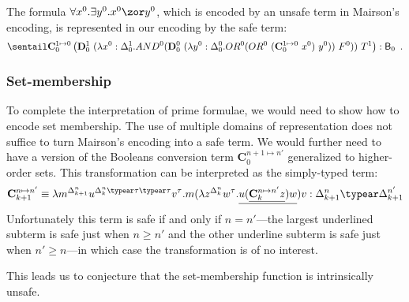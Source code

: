 \begin{example}
The formula  $\forall x^0 . \exists y^0 . x^0 \zor y^0$, which is
encoded by an unsafe term in Mairson's encoding, is represented in
our encoding by the safe term:
 $$\sentail \mathbf{C}_0^{1\mapsto 0} \left( \mathbf{D}_0^1~(\lambda x^0:\Delta_0^1. AND^0 ( \mathbf{D}_0^0 ~(\lambda y^0:\Delta_0^0. OR^0 (OR^0~(\mathbf{C}_0^{1\mapsto 0}~x^0)~y^0))~F^0))~T^1 \right) : \booltype_0 \enspace .$$
\end{example}


\subsubsection{Set-membership}
To complete the interpretation of prime formulae, we would need to show how to encode set membership. The use of multiple domains of representation does not suffice to turn Mairson's encoding into a safe term. We would further need to have a version of the Booleans conversion term $\mathbf{C}^{n+1\mapsto n'}_0$ generalized to higher-order sets.
This transformation can be interpreted as the simply-typed term:
$$ \mathbf{C}^{n\mapsto n'}_{k+1} \equiv \lambda m^{\Delta_{k+1}^n} u^{\Delta_k^n\typear \tau\typear \tau} v^\tau. m (\lambda z^{\Delta_k^n} w^\tau . \underline{u (\underline{\mathbf{C}^{n\mapsto n'}_k z}) w}) v : \Delta_{k+1}^n \typear \Delta_{k+1}^{n'}$$
Unfortunately this term is safe if and only if $n=n'$---the largest
underlined subterm is safe just when $n\geq n'$ and the other
underline subterm is safe just when $n'\geq n$---in which case the transformation is of no interest.

This leads us to conjecture that the set-membership function is intrinsically unsafe.
\smallskip



